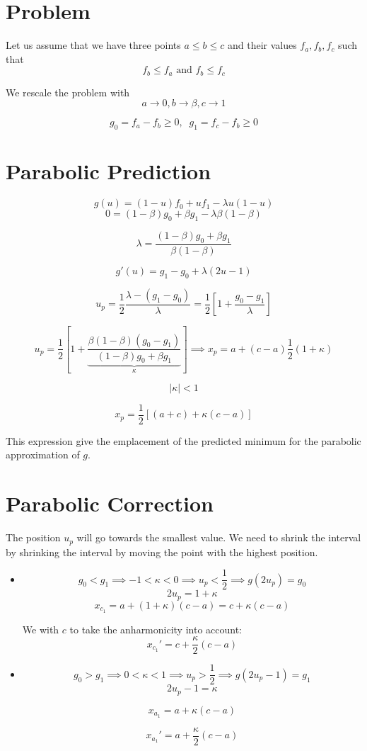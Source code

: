 \documentclass[aps,12pt]{revtex4}
\begin{document}
\section{Problem}
Let us assume that we have three points $a\leq b \leq c$ and their values
$f_a,f_b,f_c$ such that
\begin{equation}
	f_b \leq f_a \text{ and } f_b \leq f_c
\end{equation} 

We rescale the problem with
$$
	a \to 0, b \to \beta, c \to 1
$$	

$$
	g_0 = f_a - f_b \geq 0, \;\; g_1 = f_c - f_b \geq 0
$$

\section{Parabolic Prediction}
$$
	g(u) = (1-u) f_0 + u f_1 - \lambda u(1-u)
$$
$$
	0 = (1-\beta) g_0 + \beta g_1 - \lambda \beta(1-\beta)
$$

$$
	\lambda = \dfrac{(1-\beta) g_0 + \beta g_1 }{\beta(1-\beta)}
$$

$$
	g'(u) = g_1-g_0 + \lambda (2u-1)
$$

$$
	u_p = \dfrac{1}{2} \dfrac{\lambda - (g_1-g_0)}{\lambda} = \dfrac{1}{2}\left[ 1 + \dfrac{g_0-g_1}{\lambda} \right]
$$

$$
	u_p = \frac{1}{2} \left[ 1 + \underbrace{\dfrac{ \beta(1-\beta) (g_0-g_1) }{ (1-\beta) g_0 + \beta g_1 }}_\kappa \right]
	\implies x_p = a + (c-a) \frac{1}{2} \left(1+\kappa\right)  
$$

$$
	|\kappa| < 1
$$

$$
	x_p = \dfrac{1}{2}\left[ (a+c) + \kappa (c-a) \right]
$$

This expression give the emplacement of the predicted minimum for the parabolic approximation of $g$.

\section{Parabolic Correction}

The position $u_p$ will go towards the smallest value. We need to shrink the interval by shrinking the interval by moving
the point with the highest position.

\begin{itemize}
\item 
$$g_0<g_1 \implies -1 < \kappa < 0 \implies u_p < \frac{1}{2} \implies g(2u_p) = g_0$$
$$2u_p = 1+\kappa$$
$$
	x_{c_1} = a + (1+\kappa)(c-a) = c +\kappa(c-a)
$$

We with $c$ to take the anharmonicity into account:
$$
	x_{c_1}' =  c + \dfrac{\kappa}{2}(c-a)
$$

\item
$$g_0>g_1 \implies 0< \kappa < 1 \implies u_p > \frac{1}{2} \implies g(2u_p-1) = g_1$$
$$
2u_p - 1 = \kappa
$$

$$
	x_{a_1} = a + \kappa(c-a)
$$

$$
	x_{a_1}' = a + \dfrac{\kappa}{2}(c-a)
$$
\end{itemize}
\end{document}

